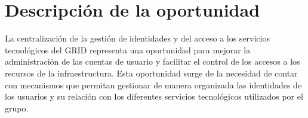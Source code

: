 \section{Descripción de la oportunidad}

La centralización de la gestión de identidades y del acceso a los servicios tecnológicos del \ac{GRID} representa una oportunidad para mejorar la administración de las cuentas de usuario y facilitar el control de los accesos a los recursos de la infraestructura. Esta oportunidad surge de la necesidad de contar con mecanismos que permitan gestionar de manera organizada las identidades de los usuarios y su relación con los diferentes servicios tecnológicos utilizados por el grupo.
